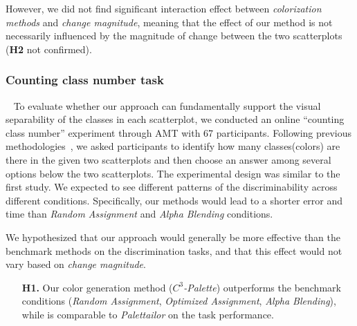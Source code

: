 {However, we did not find significant interaction effect between \emph{colorization methods} and \emph{change magnitude}, meaning that the effect of our method is not necessarily influenced by the magnitude of change between the two scatterplots (\textbf{H2} not confirmed).


\subsubsection{Counting class number task}
\
\newline
To evaluate whether our approach can fundamentally support the visual separability of the classes in each scatterplot, we conducted an online ``counting class number'' experiment through AMT with 67 participants. Following previous methodologies~\cite{Wang2018, Lu21}, we asked participants to identify how many classes(colors) are there in the given two scatterplots and then choose an answer among several options below the two scatterplots. The experimental design was similar to the first study.
We expected to see different patterns of the discriminability across different conditions. Specifically, our methods would lead to a shorter error and time than \emph{Random Assignment} and \emph{Alpha Blending} conditions.

\vspace{.3em}
 We hypothesized that our approach would generally be more effective than the benchmark methods on the discrimination tasks, and that this effect would not vary based on \emph{change magnitude}.
\begin{itemize}[noitemsep]
\setlength{\itemsep}{5pt}
    \item[\textbf{H1.}] Our color generation method (\emph{$C^3$-Palette}) outperforms the benchmark conditions (\emph{Random Assignment}, \emph{Optimized Assignment}, \emph{Alpha Blending}), while is comparable to  \emph{Palettailor} on the task performance.


\end{itemize}}
